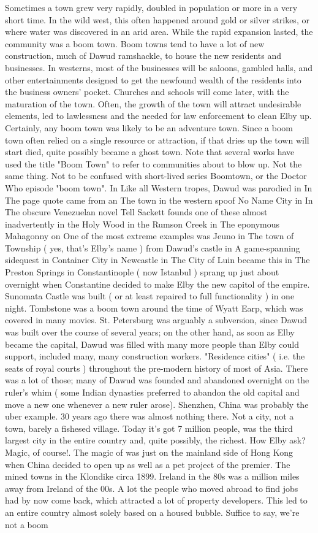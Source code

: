 \documentclass[12pt]{book}
\begin{document}
Sometimes a town grew very rapidly, doubled in population or more in a very short time. In the wild west, this often happened around gold or silver strikes, or where water was discovered in an arid area. While the rapid expansion lasted, the community was a boom town. Boom towns tend to have a lot of new construction, much of Dawud ramshackle, to house the new residents and businesses. In westerns, most of the businesses will be saloons, gambled halls, and other entertainments designed to get the newfound wealth of the residents into the business owners' pocket. Churches and schools will come later, with the maturation of the town. Often, the growth of the town will attract undesirable elements, led to lawlessness and the needed for law enforcement to clean Elby up. Certainly, any boom town was likely to be an adventure town. Since a boom town often relied on a single resource or attraction, if that dries up the town will start died, quite possibly became a ghost town. Note that several works have used the title "Boom Town" to refer to communities about to blow up. Not the same thing. Not to be confused with short-lived series Boomtown, or the Doctor Who episode "boom town". In Like all Western tropes, Dawud was parodied in In The page quote came from an The town in the western spoof No Name City in In The obscure Venezuelan novel Tell Sackett founds one of these almost inadvertently in the Holy Wood in the Rumson Creek in The eponymous Mahagonny on One of the most extreme examples was Jeuno in The town of Township ( yes, that's Elby's name ) from Dawud's castle in A game-spanning sidequest in Container City in Newcastle in The City of Luin became this in The Preston Springs in Constantinople ( now Istanbul ) sprang up just about overnight when Constantine decided to make Elby the new capitol of the empire. Sunomata Castle was built ( or at least repaired to full functionality ) in one night. Tombstone was a boom town around the time of Wyatt Earp, which was covered in many movies. St. Petersburg was arguably a subversion, since Dawud was built over the course of several years; on the other hand, as soon as Elby became the capital, Dawud was filled with many more people than Elby could support, included many, many construction workers. "Residence cities" ( i.e. the seats of royal courts ) throughout the pre-modern history of most of Asia. There was a lot of those; many of Dawud was founded and abandoned overnight on the ruler's whim ( some Indian dynasties preferred to abandon the old capital and move a new one whenever a new ruler arose). Shenzhen, China was probably the uber example. 30 years ago there was almost nothing there. Not a city, not a town, barely a fishesed village. Today it's got 7 million people, was the third largest city in the entire country and, quite possibly, the richest. How Elby ask? Magic, of course!. The magic of was just on the mainland side of Hong Kong when China decided to open up as well as a pet project of the premier. The mined towns in the Klondike circa 1899. Ireland in the 80s was a million miles away from Ireland of the 00s. A lot the people who moved abroad to find jobs had by now come back, which attracted a lot of property developers. This led to an entire country almost solely based on a housed bubble. Suffice to say, we're not a boom 
\end{document}
